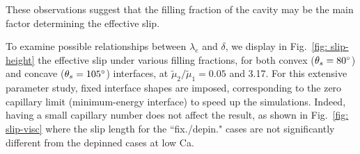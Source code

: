 These observations suggest that the filling fraction of the cavity may be the main factor determining the effective slip. 

To examine possible relationships between $\lambda_e$ and $\delta$, we display in Fig.\ \ref{fig: slip-height} the effective slip under various filling fractions, for both convex ($\theta_s=80\degree$) and concave ($\theta_s=105\degree$) interfaces, at $\tilde{\mu}_2/\tilde{\mu}_1=0.05$ and 3.17. For this extensive parameter study, fixed interface shapes are imposed, corresponding to the zero capillary limit (minimum-energy interface) to speed up the simulations. Indeed, having a small capillary number does not affect the result, as shown in Fig.\ \ref{fig: slip-visc} where the slip length for the ``fix./depin." cases are not significantly different from the depinned cases at low Ca.

